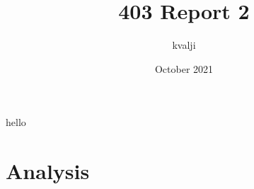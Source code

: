 \documentclass{article}
\title{403 Report 2}
\author{kvalji }
\date{October 2021}
\begin{document}
\maketitle
hello
\section{Analysis}
\end{document}

